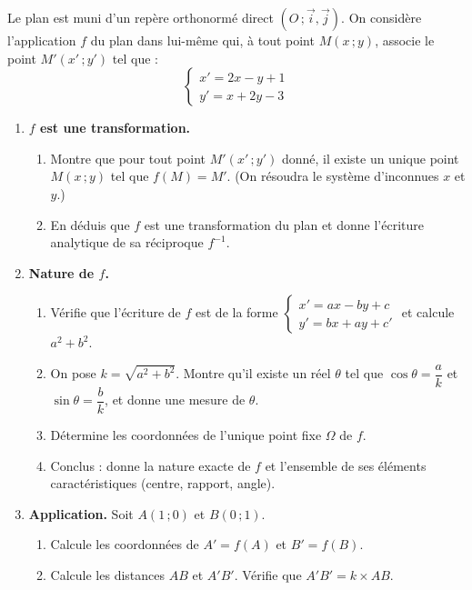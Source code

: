 \documentclass[11pt]{article}
\begin{document}
\begin{exercice}
Le plan est muni d'un repère orthonormé direct $(O\,;\vec{i},\vec{j})$. On considère l'application $f$ du plan dans lui-même qui, à tout point $M(x\,;y)$, associe le point $M'(x'\,;y')$ tel que :
\[
\begin{cases} x' = 2x - y + 1 \\ y' = x + 2y - 3 \end{cases}
\]
\begin{enumerate}
\item \textbf{$f$ est une transformation.}
\begin{enumerate}
\item Montre que pour tout point $M'(x'\,;y')$ donné, il existe un unique point $M(x\,;y)$ tel que $f(M) = M'$. (On résoudra le système d'inconnues $x$ et $y$.)
\item En déduis que $f$ est une transformation du plan et donne l'écriture analytique de sa réciproque $f^{-1}$.
\end{enumerate}
\item \textbf{Nature de $f$.}
\begin{enumerate}
\item Vérifie que l'écriture de $f$ est de la forme $\begin{cases} x' = ax - by + c \\ y' = bx + ay + c' \end{cases}$ et calcule $a^2 + b^2$.
\item On pose $k = \sqrt{a^2+b^2}$. Montre qu'il existe un réel $\theta$ tel que $\cos\theta = \dfrac{a}{k}$ et $\sin\theta = \dfrac{b}{k}$, et donne une mesure de $\theta$.
\item Détermine les coordonnées de l'unique point fixe $\Omega$ de $f$.
\item Conclus : donne la nature exacte de $f$ et l'ensemble de ses éléments caractéristiques (centre, rapport, angle).
\end{enumerate}
\item \textbf{Application.} Soit $A(1\,;0)$ et $B(0\,;1)$.
\begin{enumerate}
\item Calcule les coordonnées de $A' = f(A)$ et $B' = f(B)$.
\item Calcule les distances $AB$ et $A'B'$. Vérifie que $A'B' = k \times AB$.
\end{enumerate}
\end{enumerate}
\end{exercice}
\end{document}
